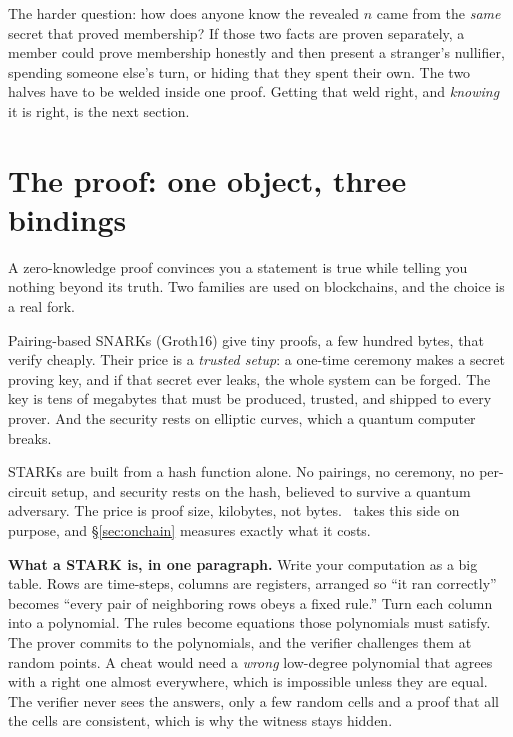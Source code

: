 \documentclass[11pt]{article}
\begin{document}
The harder question: how does anyone know the revealed $n$ came from the \emph{same}
secret that proved membership? If those two facts are proven separately, a member could
prove membership honestly and then present a stranger's nullifier, spending someone
else's turn, or hiding that they spent their own. The two halves have to be welded
inside one proof. Getting that weld right, and \emph{knowing} it is right, is the next
section.

\section{The proof: one object, three bindings}
\label{sec:proof}

A zero-knowledge proof convinces you a statement is true while telling you nothing
beyond its truth. Two families are used on blockchains, and the choice is a real fork.

Pairing-based SNARKs (Groth16) give tiny proofs, a few hundred bytes, that verify
cheaply. Their price is a \emph{trusted setup}: a one-time ceremony makes a secret
proving key, and if that secret ever leaks, the whole system can be forged. The key is
tens of megabytes that must be produced, trusted, and shipped to every prover. And the
security rests on elliptic curves, which a quantum computer breaks.

STARKs are built from a hash function alone. No pairings, no ceremony, no per-circuit
setup, and security rests on the hash, believed to survive a quantum adversary. The
price is proof size, kilobytes, not bytes. \river\ takes this side on purpose, and
\S\ref{sec:onchain} measures exactly what it costs.

\begin{intuition}
\textbf{What a STARK is, in one paragraph.} Write your computation as a big table. Rows
are time-steps, columns are registers, arranged so ``it ran correctly'' becomes ``every
pair of neighboring rows obeys a fixed rule.'' Turn each column into a polynomial. The
rules become equations those polynomials must satisfy. The prover commits to the
polynomials, and the verifier challenges them at random points. A cheat would need a
\emph{wrong} low-degree polynomial that agrees with a right one almost everywhere, which
is impossible unless they are equal. The verifier never sees the answers, only a few
random cells and a proof that all the cells are consistent, which is why the witness
stays hidden.
\end{intuition}
\end{document}
